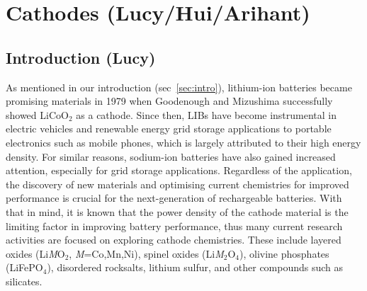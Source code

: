 \documentclass[../main.tex]{subfiles}
\begin{document}
\section{Cathodes (Lucy/Hui/Arihant)}
\label{sec:cathodes}

\subsection{Introduction (Lucy)}
\label{sec:cathode_intro}
As mentioned in our introduction (sec~\ref{sec:intro}), lithium-ion batteries became promising materials in 1979 when Goodenough and Mizushima successfully showed LiCoO$_2$ as a cathode.\cite{mizushima1980lixcoo2} Since then, LIBs have become instrumental in electric vehicles and renewable energy grid storage applications \cite{rozier2015li,whittingham2008materials,dunn2011electrical, liu2013materials,palacin2009recent} to portable electronics such as mobile phones, which is largely attributed to their high energy density. \cite{masquelier2013polyanionic,armand2008building,bruce2012li,park2010review,scrosati2011lithium,goodenough_li-ion_2013,etacheri2011challenges,takada2013progress,fergus2010recent,ellis2010positive,he2012layered,zaghib2013review} For similar reasons, sodium-ion batteries have also gained increased attention, especially for grid storage applications. \cite{ellis2012curr,kim2012electrode,palomares2012ion,fergus2012ion,yabuuchi2012p2} Regardless of the application, the discovery of new materials and optimising current chemistries for improved performance is crucial for the next-generation of rechargeable batteries. With that in mind, it is known that the power density of the cathode material is the limiting factor in improving battery performance, thus many current research activities are focused on exploring cathode chemistries. These include layered oxides (Li\textit{M}O$_2$, \textit{M}=Co,Mn,Ni), spinel oxides (Li\textit{M}$_2$O$_4$), olivine phosphates (LiFePO$_4$), disordered rocksalts, lithium sulfur, and other compounds such as silicates. \cite{daniel2014cathode, islam2014lithium}
\end{document}
